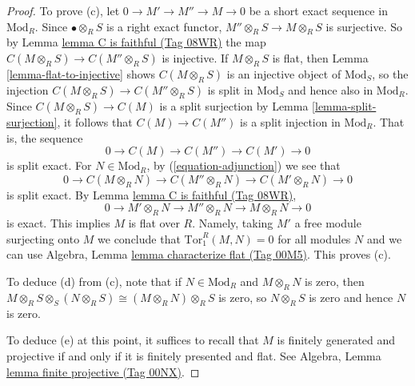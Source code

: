 \documentclass{amsart}
\theoremstyle{plain}
\theoremstyle{definition}
\theoremstyle{remark}
\numberwithin{equation}{subsection}
\begin{document}
\begin{proof}
\medskip\noindent
To prove (c), let $0 \to M' \to M'' \to M \to 0$ be a short exact sequence in 
$\text{Mod}_R$. Since $\bullet \otimes_R S$ is a right exact functor,
$M'' \otimes_R S \to M \otimes_R S$ is surjective. So by
Lemma \href{https://stacks.math.columbia.edu/tag/08WR}{lemma C is faithful (Tag 08WR)} the map
$C(M \otimes_R S) \to C(M'' \otimes_R S)$ is injective.
If $M \otimes_R S$ is flat, then
Lemma \ref{lemma-flat-to-injective} shows
$C(M \otimes_R S)$ is an injective object of $\text{Mod}_S$, so the injection
$C(M \otimes_R S) \to C(M'' \otimes_R S)$
is split in $\text{Mod}_S$ and hence also in $\text{Mod}_R$.
Since $C(M \otimes_R S) \to C(M)$ is a split surjection by 
Lemma \ref{lemma-split-surjection}, it follows that 
$C(M) \to C(M'')$ is a split injection in $\text{Mod}_R$. That is, the sequence
$$
0 \to C(M) \to C(M'') \to C(M') \to 0
$$
is split exact. 
For $N \in \text{Mod}_R$, by (\ref{equation-adjunction}) we see that 
$$
0 \to C(M \otimes_R N) \to C(M'' \otimes_R N) \to C(M' \otimes_R N) \to 0
$$
is split exact. By Lemma \href{https://stacks.math.columbia.edu/tag/08WR}{lemma C is faithful (Tag 08WR)}, 
$$
0 \to M' \otimes_R N \to M'' \otimes_R N \to M \otimes_R N \to 0
$$
is exact. This implies $M$ is flat over $R$. Namely, taking
$M'$ a free module surjecting onto $M$ we conclude that
$\text{Tor}_1^R(M, N) = 0$ for all modules $N$ and we can use
Algebra, Lemma \href{https://stacks.math.columbia.edu/tag/00M5}{lemma characterize flat (Tag 00M5)}.
This proves (c).

\medskip\noindent
To deduce (d) from (c), note that if $N \in \text{Mod}_R$ and $M \otimes_R N$ 
is zero,
then $M \otimes_R S \otimes_S (N \otimes_R S) \cong (M \otimes_R N) \otimes_R 
S$ is zero,
so $N \otimes_R S$ is zero and hence $N$ is zero.

\medskip\noindent
To deduce (e) at this point, it suffices to recall that $M$ is finitely 
generated and projective if and only if it is finitely presented and flat.
See Algebra, Lemma \href{https://stacks.math.columbia.edu/tag/00NX}{lemma finite projective (Tag 00NX)}.
\end{proof}
\end{document}
